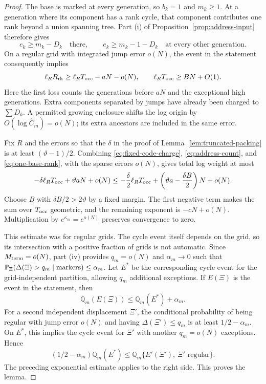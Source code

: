 \begin{proof}
The base is marked at every generation, so \(b_k=1\) and
\(m_k\ge1\).  At a generation where its component has a rank
cycle, that component contributes one rank beyond a union
spanning tree.  Part (i) of Proposition~\ref{prop:address-input}
therefore gives
\[
 e_k\ge m_k-D_k
 \quad\text{there},\qquad
 e_k\ge m_k-1-D_k
 \quad\text{at every other generation}.
\]
On a regular grid with integrated jump error \(o(N)\), the event
in the statement consequently implies
\begin{equation}
\label{eq:one-base-rank}
 \ell_RR_{\rm rk}\ge\ell_RT_{\rm occ}-aN-o(N),
 \qquad
 \ell_RT_{\rm occ}\ge BN+O(1).
\end{equation}
Here the first loss counts the generations before \(aN\) and the
exceptional high generations.  Extra components separated by
jumps have already been charged to \(\sum D_k\).  A permitted
growing enclosure shifts the log origin by
\(O(\log\widehat C_m)=o(N)\); its extra ancestors are included
in the same error.

Fix \(R\) and the errors so that the \(\delta\) in the proof of
Lemma~\ref{lem:truncated-packing} is at least
\((\vartheta-1)/2\).  Combining
\eqref{eq:fixed-code-charge}, \eqref{eq:address-count}, and
\eqref{eq:one-base-rank}, with the sparse errors \(o(N)\), gives
total log weight at most
\[
 -\delta\ell_RT_{\rm occ}+\vartheta aN+o(N)
 \le
 -\frac{\delta}{2}\ell_RT_{\rm occ}
 +\left(\vartheta a-\frac{\delta B}{2}\right)N+o(N).
\]
Choose \(B\) with \(\delta B/2>2\vartheta\) by a fixed margin.
The first negative term makes the sum over \(T_{\rm occ}\)
geometric, and the remaining exponent is \(-cN+o(N)\).
Multiplication by \(e^{\kappa_m}=e^{o(N)}\) preserves convergence
to zero.

This estimate was for regular grids.  The cycle event itself
depends on the grid, so its intersection with a positive fraction
of grids is not automatic.  Since \(M_{\rm term}=o(N)\), part (iv)
provides \(q_m=o(N)\) and \(\alpha_m\to0\) such that
\(\mathbb P_\Xi(\Delta(\Xi)>q_m\mid\text{markers})\le\alpha_m\).
Let \(E^*\) be the corresponding cycle event for the
grid-independent partition, allowing \(q_m\) additional
exceptions.  If \(E(\Xi)\) is the event in the statement, then
\[
 \mathbb Q_m(E(\Xi))\le\mathbb Q_m(E^*)+\alpha_m.
\]
For a second independent displacement \(\Xi'\), the conditional
probability of being regular with jump error \(o(N)\) and having
\(\Delta(\Xi')\le q_m\) is at least \(1/2-\alpha_m\).
On \(E^*\), this implies the cycle event for \(\Xi'\) with
another \(q_m=o(N)\) exceptions.  Hence
\[
 (1/2-\alpha_m)\mathbb Q_m(E^*)
 \le\mathbb Q_m\{E'(\Xi'),\ \Xi'\text{ regular}\}.
\]
The preceding exponential estimate applies to the right side.
This proves the lemma.
\end{proof}

